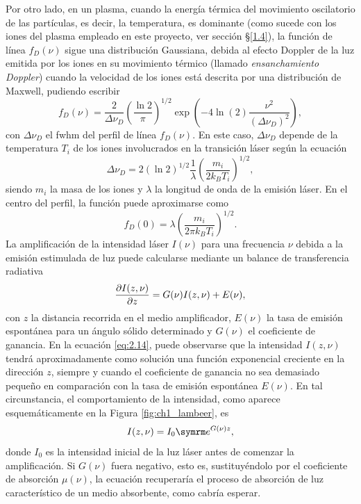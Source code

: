 Por otro lado, en un plasma, cuando la energía térmica del movimiento oscilatorio de las partículas, es decir, la temperatura, es dominante (como sucede con los iones del plasma empleado en este proyecto, ver sección \S\ref{1.4}), la función de línea $f_{D}(\nu)$ sigue una distribución Gaussiana, debida al efecto Doppler de la luz emitida por los iones en su movimiento térmico (llamado \emph{ensanchamiento Doppler})  cuando la velocidad de los iones está descrita por una distribución de Maxwell, pudiendo escribir \autocite{Tallents2003,Milonni1988,Oliva2010}
\begin{equation}\label{eq:2.11}
f_{D}(\nu) = \frac{2}{\Delta \nu_{D}} \left(\frac{\ln 2}{\pi}\right)^{1/2} \exp \left(-4 \ln(2) \frac{\nu^{2}}{(\Delta \nu_{D})^{2}}\right),
\end{equation}
con $\Delta \nu_{D}$ el \acrshort{fwhm} del perfil de línea $f_{D}(\nu)$. En este caso, $\Delta \nu_{D}$ depende de la temperatura $T_{i}$ de los iones involucrados en la transición láser según la ecuación
\begin{equation}\label{eq:2.12}
  \Delta \nu_{D} = 2(\ln 2)^{1/2} \frac{1}{\lambda}\left(\frac{m_{i}}{2k_{B}T_{i}}\right)^{1/2},
\end{equation}
siendo $m_{i}$ la masa de los iones y $\lambda$ la longitud de onda de la emisión láser. En el centro del perfil, la función puede aproximarse como
\begin{equation}\label{eq:2.13}
  f_{D}(0) = \lambda \left(\frac{m_{i}}{2 \pi k_{B}T_{i}}\right)^{1/2}.
\end{equation}
La amplificación de la intensidad láser $I(\nu)$ para una frecuencia $\nu$ debida a la emisión estimulada de luz puede calcularse mediante un balance de transferencia radiativa \autocite{Milonni1988}
\begin{equation}\label{eq:2.14}
  \frac{\partial I(z,\nu)}{\partial z} = G(\nu)I(z,\nu) + E(\nu),
\end{equation}
con $z$ la distancia recorrida en el medio amplificador, $E(\nu)$ la tasa de emisión espontánea para un ángulo sólido determinado y $G(\nu)$ el coeficiente de ganancia. En la ecuación \eqref{eq:2.14}, puede observarse que la intensidad $I(z,\nu)$ tendrá aproximadamente como solución una función exponencial creciente en la dirección $z$, siempre y cuando el coeficiente de ganancia no sea demasiado pequeño en comparación con la tasa de emisión espontánea $E(\nu)$. En tal circunstancia, el comportamiento de la intensidad, como aparece esquemáticamente en la Figura \ref{fig:ch1_lambeer}, es
\begin{equation}\label{eq:dd}
  I(z,\nu) = I_{0}\eu^{G(\nu)z},
\end{equation}
donde $I_{0}$ es la intensidad inicial de la luz láser antes de comenzar la amplificación. Si $G(\nu)$ fuera negativo, esto es, sustituyéndolo por el coeficiente de absorción $\mu(\nu)$, la ecuación recuperaría el proceso de absorción de luz característico de un medio absorbente, como cabría esperar. 


